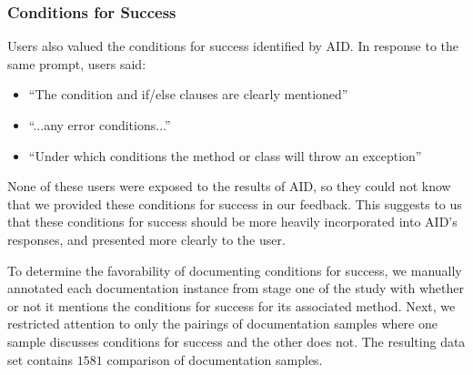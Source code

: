 \documentclass[preprint]{sigplanconf}
\begin{document}
\subsubsection{Conditions for Success}

Users also valued the conditions for success identified by AID. In response to the same prompt, users said:

\begin{itemize}
\item ``The condition and if/else clauses are clearly mentioned''
\item ``...any error conditions...''
\item ``Under which conditions the method or class will throw an exception''
\end{itemize}

None of these users were exposed to the results of AID, so they could not know that we provided these conditions for success in our feedback. This suggests to us that these conditions for success should be more heavily incorporated into AID's responses, and presented more clearly to the user.

To determine the favorability of documenting conditions for success, we manually annotated each documentation instance from stage one of the study with whether or not it mentions the conditions for success for its associated method. Next, we restricted attention to only the pairings of documentation samples where one sample discusses conditions for success and the other does not. The resulting data set contains \(1581\) comparison of documentation samples.
\end{document}
